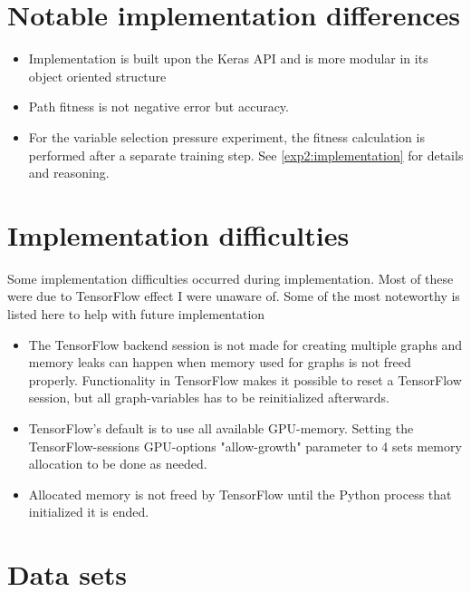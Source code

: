 \section{Notable implementation differences}
\begin{itemize}
    \item Implementation is built upon the Keras API and is more modular in its object oriented structure
    \item Path fitness is not negative error but accuracy. 
    \item For the variable selection pressure experiment, the fitness calculation is performed after a separate training step. See \ref{exp2:implementation} for details and reasoning.
\end{itemize}

\section{Implementation difficulties}\label{implementation:problems}
Some implementation difficulties occurred during implementation. Most of these were due to TensorFlow effect I were unaware of. Some of the most noteworthy is listed here to help with future implementation
\begin{itemize}
    \item The TensorFlow backend session is not made for creating multiple graphs and memory leaks can happen when memory used for graphs is not freed properly. Functionality in TensorFlow makes it possible to reset a TensorFlow session, but all graph-variables has to be reinitialized afterwards. 
    \item TensorFlow's default is to use all available GPU-memory. Setting the TensorFlow-sessions GPU-options "allow-growth" parameter to 4 sets memory allocation to be done as needed.
    \item Allocated memory is not freed by TensorFlow until the Python process that initialized it is ended.
\end{itemize}

\section{Data sets}
